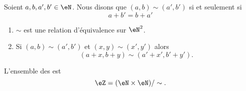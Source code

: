 \begin{propositionDef}     \label{PROPooFIKUooVHlvTt}
    Soient \( a,b,a',b'\in \eN\). Nous disons que \( (a,b)\sim(a',b')\) si et seulement si
    \begin{equation}
        a+b'=b+a'
    \end{equation}
    \begin{enumerate}
        \item
            \( \sim\) est une relation d'équivalence sur \( \eN^2\).
        \item       \label{ITEMooZQSHooSDfdvK}
            Si \( (a,b)\sim (a',b')\) et \( (x,y)\sim (x',y')\) alors
            \begin{equation}
                (a+x,b+y)\sim(a'+x',b'+y').
            \end{equation}
    \end{enumerate}
    L'ensemble des  est
    \begin{equation}
        \eZ=(\eN\times \eN)/\sim.
    \end{equation}
\end{propositionDef}

